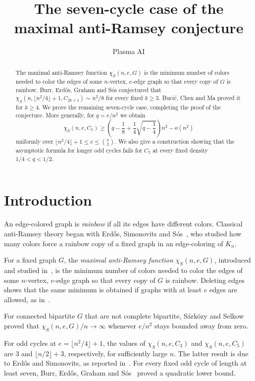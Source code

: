 \documentclass[10pt]{article}
\title{The seven-cycle case of the maximal anti-Ramsey conjecture}
\author{Plasma AI}
\date{}
\theoremstyle{remark}
\begin{document}
\maketitle

\begin{abstract}
The maximal anti-Ramsey function $\chi_S(n,e,G)$ is the minimum number of colors needed to color the edges of some $n$-vertex, $e$-edge graph so that every copy of $G$ is rainbow. Burr, Erd\H{o}s, Graham and S\'{o}s conjectured that $\chi_S(n,\lfloor n^2/4\rfloor+1,C_{2k+1}) \sim n^2/8$ for every fixed $k\ge3$. Buci\'{c}, Chen and Ma proved it for $k\ge4$. We prove the remaining seven-cycle case, completing the proof of the conjecture. More generally, for $q=e/n^2$ we obtain
\[
 \chi_S(n,e,C_7)\ge
 \left(q-\frac18+\frac14\sqrt{q-\frac14}\right)n^2-o(n^2)
\]
uniformly over $\lfloor n^2/4\rfloor+1\le e\le\binom n2$. We also give a construction showing that the asymptotic formula for longer odd cycles fails for $C_7$ at every fixed density $1/4<q<1/2$.
\end{abstract}

\section{Introduction}

An edge-colored graph is \emph{rainbow} if all its edges have different colors. Classical anti-Ramsey theory began with Erd\H{o}s, Simonovits and S\'{o}s~\cite{ESS}, who studied how many colors force a rainbow copy of a fixed graph in an edge-coloring of $K_n$.

For a fixed graph $G$, the \emph{maximal anti-Ramsey function} $\chi_S(n,e,G)$, introduced and studied in~\cite{BEGS,BEFGS}, is the minimum number of colors needed to color the edges of some $n$-vertex, $e$-edge graph so that every copy of $G$ is rainbow. Deleting edges shows that the same minimum is obtained if graphs with at least $e$ edges are allowed, as in~\cite{BCM}.

For connected bipartite $G$ that are not complete bipartite, S\'{a}rk\"{o}zy and Selkow~\cite[Theorem~4]{SS} proved that $\chi_S(n,e,G)/n\to\infty$ whenever $e/n^2$ stays bounded away from zero.

For odd cycles at $e=\lfloor n^2/4\rfloor+1$, the values of $\chi_S(n,e,C_3)$ and $\chi_S(n,e,C_5)$ are $3$ and $\lfloor n/2\rfloor+3$, respectively, for sufficiently large $n$. The latter result is due to Erd\H{o}s and Simonovits, as reported in~\cite[Sections~3--4]{BEGS}. For every fixed odd cycle of length at least seven, Burr, Erd\H{o}s, Graham and S\'{o}s~\cite[Theorem~5.1]{BEGS} proved a quadratic lower bound.
\end{document}
